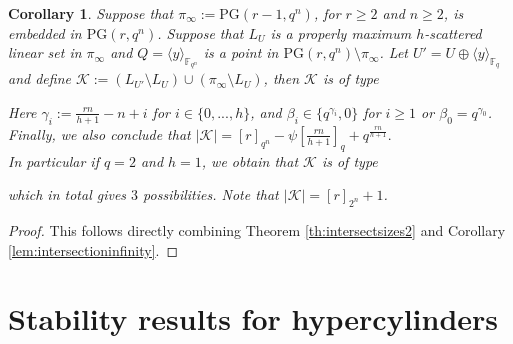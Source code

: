 \documentclass[11pt]{amsart}
\newtheorem{corollary}[theorem]{Corollary}
\newcommand{\PG}{\mathrm{PG}}
\begin{document}
\begin{corollary}
Suppose that $\pi_\infty:=\PG(r-1,q^n)$, for $r\geq 2$ and $n\geq 2$, is embedded in $\PG(r,q^n)$. Suppose that $L_{U}$ is a properly maximum $h$-scattered linear set in $\pi_\infty$ and $Q=\langle y\rangle_{\mathbb{F}_{q^n}}$ is a point in $\PG(r,q^n)\setminus\pi_\infty$. Let $U'=U \oplus \langle y\rangle_{\mathbb{F}_{q}}$ and define $\mathcal{K}:=(L_{U'}\setminus L_U)\cup (\pi_\infty \setminus L_U)$, then $\mathcal{K}$ is of type

\begin{center}
\end{center}
Here  $\gamma_i:=\frac{rn}{h+1}-n+i$ for $i\in\{0,...,h\}$, and $\beta_i\in \{q^{\gamma_i},0\}$ for $i\geq 1$ or $\beta_0=q^{\gamma_0}$. Finally, we also conclude that
$|\mathcal{K}|= [r]_{q^n}-\psi\left[\frac{rn}{h+1}\right]_q+ q^{\frac{rn}{h+1}}.$\\

In particular if $q=2$ and $h=1$, we obtain that $\mathcal{K}$ is of type 
\begin{center}
\end{center}
which in total gives $3$ possibilities. Note that $|\mathcal{K}|= [r]_{2^n}+1 $.
\end{corollary}
\begin{proof}
This follows directly combining Theorem \ref{th:intersectsizes2} and Corollary \ref{lem:intersectioninfinity}.
\end{proof}

\section{Stability results for hypercylinders}\label{sec:stab}
\end{document}
